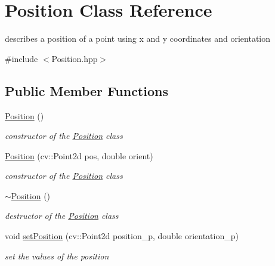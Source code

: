 \hypertarget{class_position}{}\section{Position Class Reference}
\label{class_position}


describes a position of a point using x and y coordinates and orientation  




{\ttfamily \#include $<$Position.\+hpp$>$}

\subsection*{Public Member Functions}
\begin{DoxyCompactItemize}
\item 
\mbox{\label{class_position_a369a577425f8ba02e8750d04b6a088db}} 
\mbox{\hyperlink{class_position_a369a577425f8ba02e8750d04b6a088db}{Position}} ()
\begin{DoxyCompactList}\small\item\em constructor of the \mbox{\hyperlink{class_position}{Position}} class \end{DoxyCompactList}\item 
\mbox{\hyperlink{class_position_adafef18a82e49bf4c91ff0a31b82ff05}{Position}} (cv\+::\+Point2d pos, double orient)
\begin{DoxyCompactList}\small\item\em constructor of the \mbox{\hyperlink{class_position}{Position}} class \end{DoxyCompactList}\item 
\mbox{\label{class_position_abe83df4cab7af756636b4e39e4378f4a}} 
\mbox{\hyperlink{class_position_abe83df4cab7af756636b4e39e4378f4a}{$\sim$\+Position}} ()
\begin{DoxyCompactList}\small\item\em destructor of the \mbox{\hyperlink{class_position}{Position}} class \end{DoxyCompactList}\item 
void \mbox{\hyperlink{class_position_acf00d240f456cc9b2c2910e803f53605}{set\+Position}} (cv\+::\+Point2d position\+\_\+p, double orientation\+\_\+p)
\begin{DoxyCompactList}\small\item\em set the values of the position \end{DoxyCompactList}\item 

\end{DoxyCompactItemize}
